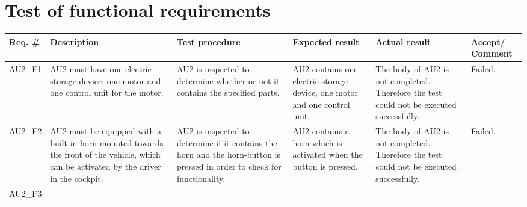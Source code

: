 \section{Test of functional requirements}

\begin{longtable}{|p{1.6 cm}|p{2.9 cm}|p{2.9 cm}|p{1.9 cm}|p{1.8 cm}|p{1.8 cm}|}
	\hline
	\textbf{Req. \#} & \textbf{Description} & \textbf{Test procedure} & 
	\textbf{Expected result} & \textbf{Actual result} & \textbf{Accept/ Comment} \\ \hline
	\endhead
	AU2\_F1 
	& AU2 must have one electric storage device, one motor and one control unit for the motor.
	& AU2 is inspected to determine whether or not it contains the specified parts.
	& AU2 contains one electric storage device, one motor and one control unit.
	& The body of AU2 is not completed. Therefore the test could not be executed successfully.
	& Failed.\\ \hline
	AU2\_F2 
	& AU2 must be equipped with a built-in horn mounted towards the front of the vehicle, which can be activated by the driver in the cockpit.
	& AU2 is inspected to determine if it contains the horn and the horn-button is pressed in order to check for functionality.
	& AU2 contains a horn which is activated when the button is pressed.
	& The body of AU2 is not completed. Therefore the test could not be executed successfully.
	& Failed.\\ \hline
	AU2\_F3 
	

\end{longtable}
